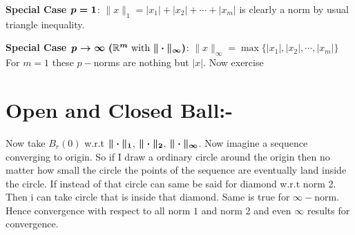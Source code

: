 \textbf{Special Case $\boldsymbol{p=1}$}: $\|x\|_1=|x_1|+|x_2|+\cdots+|x_m|$ is clearly a norm by usual triangle inequality. \par
\textbf{Special Case $\bs{p\to\infty\ (\bbR^m$ with $\|\cdot\|_{\infty})}$}: $\|x\|_{\infty}=\max\{|x_1|,|x_2|,\cdots,|x_m|\}$\\
For $m=1$ these $p-$norms are nothing but $|x|$.
Now exercise
\section{Open and Closed Ball:-}


Now take $B_r(0)$ w.r.t \textcolor{myr}{$\boldsymbol{\|\cdot\|_1}$}, \textcolor{myg}{$\boldsymbol{\|\cdot\|_2}$}, \textcolor{myb}{$\boldsymbol{\|\cdot\|_{\infty}}$}.
Now imagine a sequence converging to origin. So if I draw a ordinary circle around the origin then no matter how small the circle the points of the sequence are eventually land inside the circle. If instead of that circle can same be said for diamond w.r.t norm 2. Then i can take circle that is inside that diamond. Same is true for $\infty-$norm. Hence convergence with respect to all norm $1$ and norm 2 and even $\infty$ results for convergence.

